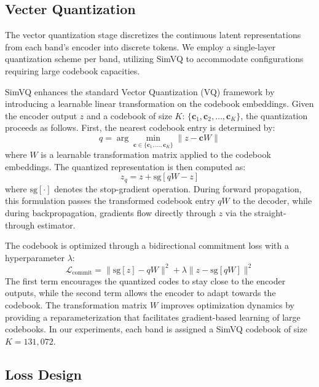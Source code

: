 \documentclass[11pt]{article}
\begin{document}
\subsection{Vecter Quantization}
The vector quantization stage discretizes the continuous latent representations from each band's encoder into discrete tokens. We employ a single-layer quantization scheme per band, utilizing SimVQ\cite{zhu2024addressing} to accommodate configurations requiring large codebook capacities.

SimVQ\cite{zhu2024addressing} enhances the standard Vector Quantization (VQ) framework by introducing a learnable linear transformation on the codebook embeddings. Given the encoder output $z$ and a codebook of size $K$: $\{\mathbf{c}_1, \mathbf{c}_2, \ldots, \mathbf{c}_K\}$, the quantization proceeds as follows. First, the nearest codebook entry is determined by:
\begin{equation}
q = \arg\min_{\mathbf{c} \in \{\mathbf{c}_1, \ldots, \mathbf{c}_K\}} \|z - \mathbf{c}W\|
\end{equation}
where $W$ is a learnable transformation matrix applied to the codebook embeddings. The quantized representation is then computed as:
\begin{equation}
z_q = z + \text{sg}[qW - z]
\end{equation}
where $\text{sg}[\cdot]$ denotes the stop-gradient operation. During forward propagation, this formulation passes the transformed codebook entry $qW$ to the decoder, while during backpropagation, gradients flow directly through $z$ via the straight-through estimator.

The codebook is optimized through a bidirectional commitment loss with a hyperparameter $\lambda$:
\begin{equation}
\mathcal{L}_{\text{commit}} = \|\text{sg}[z] - qW\|^2 + \lambda \|z - \text{sg}[qW]\|^2
\label{eq:commitment}
\end{equation}
The first term encourages the quantized codes to stay close to the encoder outputs, while the second term allows the encoder to adapt towards the codebook. The transformation matrix $W$ improves optimization dynamics by providing a reparameterization that facilitates gradient-based learning of large codebooks. In our experiments, each band is assigned a SimVQ codebook of size $K = 131{,}072$.


\subsection{Loss Design}
\end{document}
